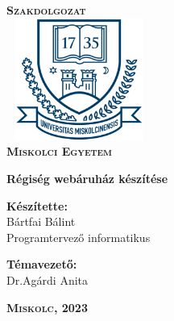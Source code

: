 \begin{titlepage}
\centering
\vspace*{2cm}
\huge\textsc{\textbf{Szakdolgozat}}\\[1cm]
\includegraphics[width=4.8cm, height=4cm,keepaspectratio]{images/me_logo.png}\\
\textbf{\textsc{Miskolci Egyetem}}

\vspace*{2cm}

{\LARGE\textbf{Régiség webáruház készítése}}

\vspace*{2cm}
\large
\textbf{Készítette:}\\[0.8ex]
Bártfai Bálint\\[0.8ex]
Programtervező informatikus

\vspace*{0.5cm}
\textbf{Témavezető:}\\[0.8ex]
Dr.Agárdi Anita

\vfill

\large
\textbf{\textsc{Miskolc, 2023}}

\end{titlepage}
